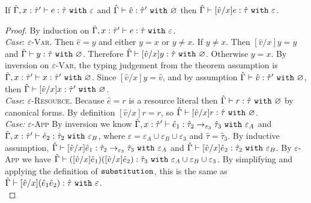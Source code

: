 \begin{lemma}[Substitution]
If $\hat \Gamma, x: \hat \tau' \vdash e: \hat \tau~\mathtt{with}~ \varepsilon$ and $\hat \Gamma \vdash \hat v: \hat \tau'~\mathtt{with}~ \varnothing$ then $\hat \Gamma \vdash [\hat v/x]e: \hat \tau~\mathtt{with}~ \varepsilon$.
\end{lemma}

\begin{proof} By induction on $\hat \Gamma, x: \hat \tau' \vdash e: \hat \tau~\mathtt{with}~ \varepsilon$. \\

\textit{Case}: \textsc{$\varepsilon$-Var}. Then $\hat e = y$ and either $y = x$ or $y \neq x$. If $y \neq x$. Then $[\hat v/x]y = y$ and $\hat \Gamma \vdash y: \hat \tau~\mathtt{with}~ \varnothing$. Therefore $\hat \Gamma \vdash [\hat v/x]y: \hat \tau~\mathtt{with}~ \varnothing$. Otherwise $y = x$. By inversion on \textsc{$\varepsilon$-Var}, the typing judgement from the theorem assumption is $\hat \Gamma, x: \hat \tau' \vdash x: \hat \tau'~\mathtt{with}~ \varnothing$. Since $[\hat v/x]y = \hat v$, and by assumption $\hat \Gamma \vdash \hat v: \hat \tau'~\mathtt{with}~ \varnothing$, then $\hat \Gamma \vdash [\hat v/x]x: \hat \tau'~\mathtt{with}~ \varnothing$. \\

\textit{Case}: \textsc{$\varepsilon$-Resource}. Because $\hat e = r$ is a resource literal then $\hat \Gamma \vdash r: \hat \tau~\mathtt{with}~ \varnothing$ by canonical forms. By definition $[\hat v/x]r = r$, so $\hat \Gamma \vdash [\hat v/x]r: \hat \tau~\mathtt{with}~ \varnothing$. \\

\textit{Case:} \textsc{$\varepsilon$-App} By inversion we know $\hat \Gamma, x: \hat \tau' \vdash \hat e_1:\hat \tau_2 \rightarrow_{\varepsilon_3} \hat \tau_3~\mathtt{with}~ \varepsilon_A$ and $\hat \Gamma, x: \hat \tau' \vdash \hat e_2: \hat \tau_2~\mathtt{with}~ \varepsilon_B$, where $\varepsilon = \varepsilon_A \cup \varepsilon_B \cup \varepsilon_3$ and $\hat \tau = \hat \tau_3$. By inductive assumption, $\hat \Gamma \vdash [\hat v/x]\hat e_1: \hat \tau_2 \rightarrow_{\varepsilon_3} \hat \tau_3~\mathtt{with}~ \varepsilon_A$ and $\hat \Gamma \vdash [\hat v/x]\hat e_2: \hat \tau_2~\mathtt{with}~ \varepsilon_B$. By \textsc{$\varepsilon$-App} we have $\hat \Gamma \vdash ([\hat v/x]\hat e_1) ([\hat v/x]\hat e_2) : \hat \tau_3~\mathtt{with}~ \varepsilon_A \cup \varepsilon_B \cup \varepsilon_3$. By simplifying and applying the definition of $\mathtt{substitution}$, this is the same as $\hat \Gamma \vdash [\hat v/x](\hat e_1 \hat e_2): \hat \tau~\mathtt{with}~ \varepsilon$. \\


\end{proof}
